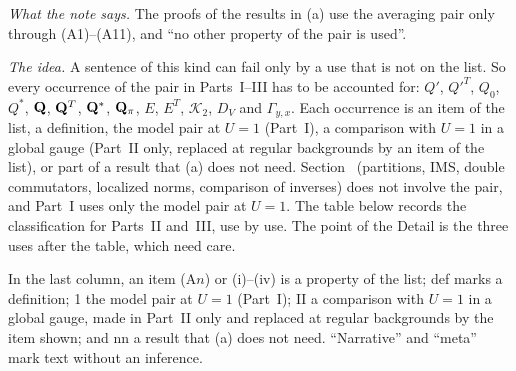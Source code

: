 \begin{detail}\label{d7:A6table}
\emph{What the note says.} The proofs of the results in (a) use the averaging pair only through (A1)--(A11), and ``no other property of the pair is used''.

\emph{The idea.} A sentence of this kind can fail only by a use that is not on the list. So every occurrence of the pair in Parts~I--III has to be accounted for: $Q'$, $Q'^T$, $Q_0$, $Q^*$, $\mathbf Q$, $\mathbf Q^T$, $\mathbf Q^*$, $\mathbf Q_\pi$, $E$, $E^T$, $\mathcal K_2$, $D_V$ and $\Gamma_{y,x}$. Each occurrence is an item of the list, a definition, the model pair at $U=1$ (Part~I), a comparison with $U=1$ in a global gauge (Part~II only, replaced at regular backgrounds by an item of the list), or part of a result that (a) does not need. Section~ (partitions, IMS, double commutators, localized norms, comparison of inverses) does not involve the pair, and Part~I uses only the model pair at $U=1$. The table below records the classification for Parts~II and~III, use by use. The point of the Detail is the three uses after the table, which need care.

In the last column, an item (A$n$) or (i)--(iv) is a property of the list; \textsf{def} marks a definition; \textsf{1} the model pair at $U=1$ (Part~I); \textsf{II} a comparison with $U=1$ in a global gauge, made in Part~II only and replaced at regular backgrounds by the item shown; and \textsf{nn} a result that (a) does not need. ``Narrative'' and ``meta'' mark text without an inference.


\end{detail}
